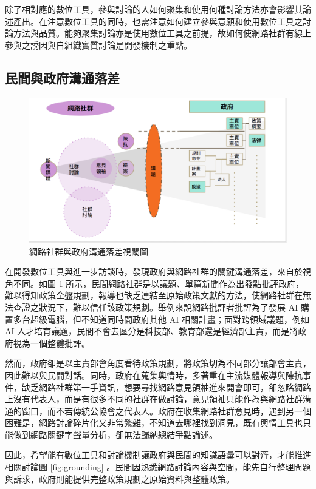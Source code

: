 \documentclass[12pt,a4paper]{article}
\begin{document}
\begin{enumerate}
除了相對應的數位工具，參與討論的人如何聚集和使用何種討論方法亦會影響其論述產出。在注意數位工具的同時，也需注意如何建立參與意願和使用數位工具之討論方法與品質。能夠聚集討論亦是使用數位工具之前提，故如何使網路社群有線上參與之誘因與自組織實質討論是開發機制之重點。
\end{enumerate}

\subsection{民間與政府溝通落差}
\label{sec:org5b23b34}
\begin{figure}[htbp]
\centering
\includegraphics[width=.9\linewidth]{./images/gap1.png}
\caption{\label{fig:gap1}
網路社群與政府溝通落差視閾圖}
\end{figure}

在開發數位工具與進一步訪談時，發現政府與網路社群的關鍵溝通落差，來自於視角不同。如圖 \ref{fig:gap1} 所示，民間網路社群是以議題、單篇新聞作為出發點批評政府，難以得知政策全盤規劃，報導也缺乏連結至原始政策文獻的方法，使網路社群在無法查證之狀況下，難以信任該政策規劃。舉例來說網路批評者批評為了發展 AI 購置多台超級電腦，但不知道同時間政府其他 AI 相關計畫；面對跨領域議題，例如 AI 人才培育議題，民間不會去區分是科技部、教育部還是經濟部主責，而是將政府視為一個整體批評。

然而，政府卻是以主責部會角度看待政策規劃，將政策切為不同部分讓部會主責，因此難以與民間對話。同時，政府在蒐集輿情時，多著重在主流媒體報導與陳抗事件，缺乏網路社群第一手資訊，想要尋找網路意見領袖進來開會即可，卻忽略網路上沒有代表人，而是有很多不同的社群在做討論，意見領袖只能作為與網路社群溝通的窗口，而不若傳統公協會之代表人。政府在收集網路社群意見時，遇到另一個困難是，網路討論碎片化又非常繁雜，不知道去哪裡找到洞見，既有輿情工具也只能做到網路關鍵字聲量分析，卻無法歸納總結爭點論述。

因此，希望能有數位工具和討論機制讓政府與民間的知識語彙可以對齊，才能推進相關討論圖 \ref{fig:grounding} 。民間因熟悉網路討論內容與空間，能先自行整理問題與訴求，政府則能提供完整政策規劃之原始資料與整體政策。
\end{document}
